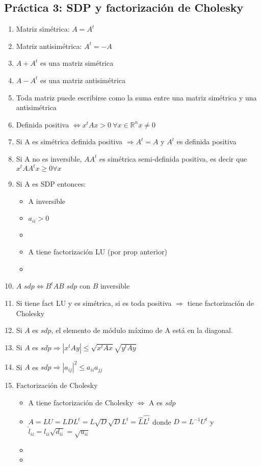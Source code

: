 \subsection*{Práctica 3: SDP y factorización de Cholesky}
\begin{enumerate}
    \item Matriz simétrica: $A=A^t$
    \item Matriz antisimétrica: $A^t=-A$
    \item $A+A^t$ es una matriz simétrica
    \item $A-A^t$ es una matriz antisimétrica
    \item Toda matriz puede escribirse como la suma entre una matriz simétrica y una antisimétrica
    \item Definida positiva $\iff x^tAx>0 \  \forall x \in \mathbb{R}^n x\neq0$
    \item Si A es simétrica definida positiva $\Rightarrow A^t = A$ y $A^t$ es definida positiva
    \item Si A no es inversible, $AA^t$ es simétrica semi-definida positiva, es decir que $x^tAA^tx \geq 0 \forall x $
    \item Si A es SDP entonces:
    \begin{itemize}
        \item A inversible
        \item $a_{ii} > 0$
        \item {}
        \item A tiene factorización LU (por prop anterior)
        \item {}
    \end{itemize}
    \item $A$ $sdp \iff B^tAB$ $sdp$ con $B$ inversible
    \item Si tiene fact LU y es simétrica, si es toda positiva $\Rightarrow$ tiene factorización de Cholesky
    \item Si $A$ es $sdp$, el elemento de módulo máximo de A está en la diagonal. 
    \item Si $A$ es $sdp \Rightarrow |x^tAy| \leq \sqrt{x^tAx}\sqrt{y^tAy}$ 
    \item Si $A$ es $sdp \Rightarrow |a_{ij}|^2\leq a_{ii}a_{jj}$
    \item Factorización de Cholesky
    \begin{itemize}
        \item A tiene factorización de Cholesky $\iff$ A es $sdp$
        \item $A = LU = LDL^t = L\sqrt{D}\sqrt{D}L^t = \hat{L}\hat{L^t}$ donde $D = L^{-1}U^t$ y $\hat{l}_{ii} = l_{ii}\sqrt{d_{ii}} = \sqrt{u_{ii}}$
        \item {}
        \item {}
    \end{itemize}
\end{enumerate}

